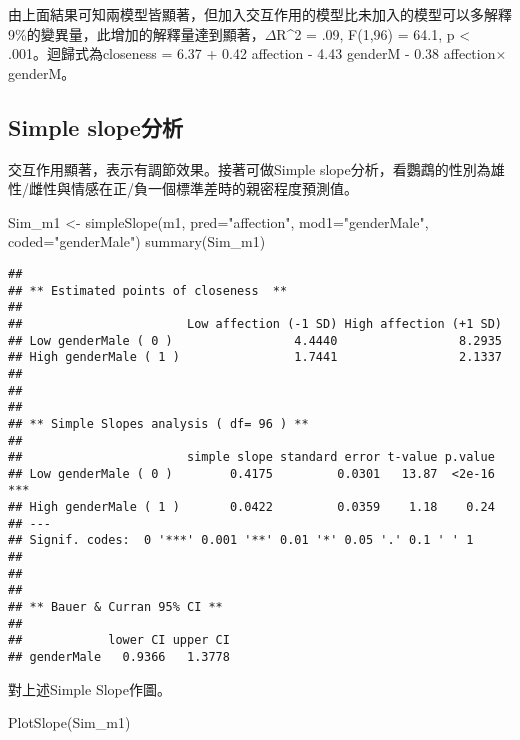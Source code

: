 \documentclass[
]{book}
\newenvironment{Shaded}{\begin{snugshade}}{\end{snugshade}}
\newcommand{\AttributeTok}[1]{\textcolor[rgb]{0.77,0.63,0.00}{#1}}
\newcommand{\FunctionTok}[1]{\textcolor[rgb]{0.00,0.00,0.00}{#1}}
\newcommand{\NormalTok}[1]{#1}
\newcommand{\OtherTok}[1]{\textcolor[rgb]{0.56,0.35,0.01}{#1}}
\newcommand{\StringTok}[1]{\textcolor[rgb]{0.31,0.60,0.02}{#1}}
\begin{document}
由上面結果可知兩模型皆顯著，但加入交互作用的模型比未加入的模型可以多解釋9\%的變異量，此增加的解釋量達到顯著，\(\Delta\)R\^{}2 = .09, F(1,96) = 64.1, p \textless{} .001。迴歸式為closeness = 6.37 + 0.42 affection - 4.43 genderM - 0.38 affection\(\times\)genderM。

\hypertarget{simple-slopeux5206ux6790}{%
\subsection{Simple slope分析}\label{simple-slopeux5206ux6790}}

交互作用顯著，表示有調節效果。接著可做Simple slope分析，看鸚鵡的性別為雄性/雌性與情感在正/負一個標準差時的親密程度預測值。

\begin{Shaded}
\begin{Highlighting}[]
\NormalTok{Sim\_m1 }\OtherTok{\textless{}{-}} \FunctionTok{simpleSlope}\NormalTok{(m1, }\AttributeTok{pred=}\StringTok{"affection"}\NormalTok{, }\AttributeTok{mod1=}\StringTok{"genderMale"}\NormalTok{, }\AttributeTok{coded=}\StringTok{"genderMale"}\NormalTok{)}
\FunctionTok{summary}\NormalTok{(Sim\_m1)}
\end{Highlighting}
\end{Shaded}

\begin{verbatim}
## 
## ** Estimated points of closeness  **
## 
##                       Low affection (-1 SD) High affection (+1 SD)
## Low genderMale ( 0 )                 4.4440                 8.2935
## High genderMale ( 1 )                1.7441                 2.1337
## 
## 
## 
## ** Simple Slopes analysis ( df= 96 ) **
## 
##                       simple slope standard error t-value p.value    
## Low genderMale ( 0 )        0.4175         0.0301   13.87  <2e-16 ***
## High genderMale ( 1 )       0.0422         0.0359    1.18    0.24    
## ---
## Signif. codes:  0 '***' 0.001 '**' 0.01 '*' 0.05 '.' 0.1 ' ' 1
## 
## 
## 
## ** Bauer & Curran 95% CI **
## 
##            lower CI upper CI
## genderMale   0.9366   1.3778
\end{verbatim}

對上述Simple Slope作圖。

\begin{Shaded}
\begin{Highlighting}[]
\FunctionTok{PlotSlope}\NormalTok{(Sim\_m1)}
\end{Highlighting}
\end{Shaded}
\end{document}
